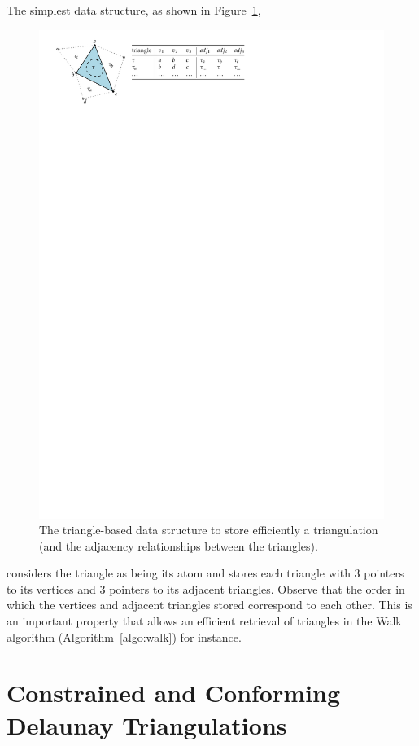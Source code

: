 The simplest data structure, as shown in Figure~\ref{fig:tr_ds}, 
\begin{figure}
  \centering
  \includegraphics[width=0.95\linewidth]{figs/tr_ds}
  \caption{The triangle-based data structure to store efficiently a triangulation (and the adjacency relationships between the triangles).}%
\label{fig:tr_ds}
\end{figure}
considers the triangle as being its atom and stores each triangle with 3 pointers to its vertices and 3 pointers to its adjacent triangles. 
Observe that the order in which the vertices and adjacent triangles stored correspond to each other. 
This is an important property that allows an efficient retrieval of triangles in the Walk algorithm (Algorithm~\ref{algo:walk}) for instance.




\section{Constrained and Conforming Delaunay Triangulations}

